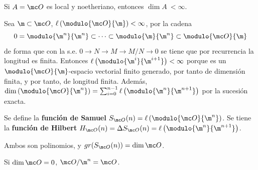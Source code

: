\begin{prop}
    Si $A = \mc O$ es local y noetheriano, entonces $\dim A\ < \infty$. 
\end{prop}
\begin{dem}
    Sea $\m \subset \mc O$, $\ell\left( \modulo{\mc O}{\m}\right) < \infty$, por la cadena
    $$0 = \modulo{\m^n}{\m^n}\subset \cdots \subset \modulo{\m}{\m^{n}} \subset \modulo{\mc O}{\m}$$
     de forma que con la s.e. $0 \to N \to M \to M/N \to 0$ se tiene que por recurrencia la longitud es finita. Entonces $\ell \left( \modulo{\m^i}{\m^{i+1}}\right) < \infty$ porque es un $\modulo{\mc O}{\m}$-espacio vectorial finito generado, por tanto de dimensi\'on finita, y por tanto, de longitud finita. Adem\'as, $\dim \left(\modulo{\mc O}{\m^n}\right) = \sum_{i=0}^{n-1} \ell\left(\modulo{\m^n}{\m^{n+1}}\right)$ por la sucesi\'on exacta.
\end{dem}
\begin{defi}
    Se define la \textbf{funci\'on de Samuel} $S_{\mc O}(n)=\ell\left(\modulo{\mc O}{\m^n}\right)$. Se tiene la \textbf{funci\'on de Hilbert} $H_{\mc O}(n)=\Delta S_{\mc O}(n) = \ell\left(\modulo{\m^n}{\m^{n+1}}\right)$. 
\end{defi}
\begin{prop}
    Ambos son polinomios, y $gr(S_{\mc O}(n)) = \dim \mc O$. 
\end{prop}
\begin{ejem}
    Si $\dim \mc O = 0$, $\mc O/\m^n = \mc O$. 
\end{ejem}

